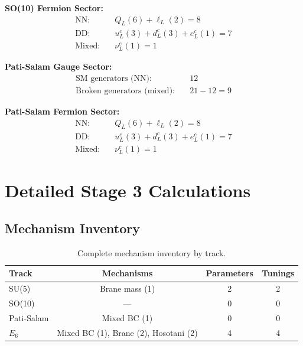 \documentclass[11pt,a4paper]{article}
\begin{document}
\textbf{SO(10) Fermion Sector:}
\begin{equation}
\label{eq:bc-so10-ferm}
\begin{aligned}
\text{NN:} \quad &Q_L(6) + \ell_L(2) = 8 \\
\text{DD:} \quad &u^c_L(3) + d^c_L(3) + e^c_L(1) = 7 \\
\text{Mixed:} \quad &\nu^c_L(1) = 1
\end{aligned}
\end{equation}

\textbf{Pati-Salam Gauge Sector:}
\begin{equation}
\label{eq:bc-ps-gauge}
\begin{aligned}
\text{SM generators (NN):} \quad &12 \\
\text{Broken generators (mixed):} \quad &21 - 12 = 9
\end{aligned}
\end{equation}

\textbf{Pati-Salam Fermion Sector:}
\begin{equation}
\label{eq:bc-ps-ferm}
\begin{aligned}
\text{NN:} \quad &Q_L(6) + \ell_L(2) = 8 \\
\text{DD:} \quad &u^c_L(3) + d^c_L(3) + e^c_L(1) = 7 \\
\text{Mixed:} \quad &\nu^c_L(1) = 1
\end{aligned}
\end{equation}

\section{Detailed Stage 3 Calculations}
\label{app:stage3-detail}

\subsection{Mechanism Inventory}
\label{app:mechanism-inventory}

\begin{table}[ht]
\centering
\caption{Complete mechanism inventory by track.}
\label{tab:mechanism-inventory}
\begin{tabular}{lccc}
\toprule
Track & Mechanisms & Parameters & Tunings \\
\midrule
SU(5) & Brane mass (1) & 2 & 2 \\
SO(10) & --- & 0 & 0 \\
Pati-Salam & Mixed BC (1) & 0 & 0 \\
$E_6$ & Mixed BC (1), Brane (2), Hosotani (2) & 4 & 4 \\
\bottomrule
\end{tabular}
\end{table}
\end{document}
